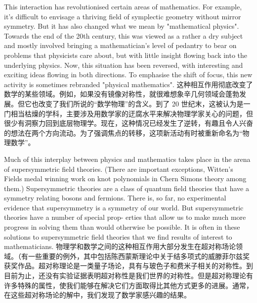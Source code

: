 \documentclass{ctexart}
\begin{document}
\begin{paracol}{2}
This interaction has revolutionised certain areas of mathematics. For example, it's difficult to envisage a thriving field of symplectic geometry without mirror symmetry. But it has also changed what we mean by "mathematical physics". Towards the end of the 20th century, this was viewed as a rather a dry subject and mostly involved bringing a mathematician's level of pedantry to bear on problems that physicists care about, but with little insight flowing back into the underlying physics. Now, this situation has been reversed, with interesting and exciting ideas flowing in both directions. To emphasise the shift of focus, this new activity is sometimes rebranded "physical mathematics".
\switchcolumn
这种相互作用彻底改变了数学的某些领域。例如，如果没有镜像对称性，就很难想象辛几何领域会蓬勃发展。但它也改变了我们所说的“数学物理”的含义。到了 20 世纪末，这被认为是一门相当枯燥的学科，主要涉及用数学家的迂腐水平来解决物理学家关心的问题，但很少有洞察力回到底层物理学。现在，这种情况已经发生了逆转，有趣且令人兴奋的想法在两个方向流动。为了强调焦点的转移，这项新活动有时被重新命名为“物理数学”。
\switchcolumn*

Much of this interplay between physics and mathematics takes place in the arena of supersymmetric field theories. (There are important exceptions, Witten's Fields medal winning work on knot polynomials in Chern Simons theory among them.) Supersymmetric theories are a class of quantum field theories that have a symmetry relating bosons and fermions. There is, so far, no experimental evidence that supersymmetry is a symmetry of our world. But supersymmetric theories have a number of special prop- erties that allow us to make much more progress in solving them than would otherwise be possible. It is often in these solutions to supersymmetric field theories that we find results of interest to mathematicians.
\switchcolumn
物理学和数学之间的这种相互作用大部分发生在超对称场论领域。（有一些重要的例外，其中包括陈西蒙斯理论中关于结多项式的威滕菲尔兹奖获奖作品。超对称理论是一类量子场论，具有与玻色子和费米子相关的对称性。到目前为止，还没有实验证据表明超对称性是我们世界的对称性。但是超对称理论有许多特殊的属性，使我们能够在解决它们方面取得比其他方式更多的进展。通常，在这些超对称场论的解中，我们发现了数学家感兴趣的结果。
\switchcolumn*


\end{paracol}
\end{document}
